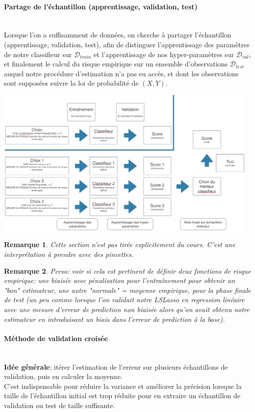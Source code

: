 \documentclass[a4paper]{article}
\theoremstyle{plain}
\newtheorem*{remark*}{Remarque}
\newcommand{\myparagraph}[1]{\paragraph{#1}\mbox{}\\}
\begin{document}
\myparagraph{Partage de l'échantillon (apprentissage, validation, test)} 
Lorsque l'on a suffisamment de données, on cherche à partager l'échantillon (apprentissage, validation, test), afin de distinguer l'apprentissage des paramètres de notre classifieur sur $\mathcal{D}_{train}$ et l'apprentissage de nos hyper-paramètres sur $\mathcal{D}_{val}$, et finalement le calcul du risque empirique sur un ensemble d'observations $\mathcal{D}_{test}$ auquel notre procédure d'estimation n'a pas eu accès, et dont les observations sont supposées suivre la loi de probabilité de $(X,Y)$.

\includegraphics[width=13cm]{Validation.png}

\begin{remark*}
Cette section n'est pas tirée explicitement du cours. C'est une interprétation à prendre avec des pincettes. 
\end{remark*}
\begin{remark*}
Perso: voir si cela est pertinent de définir deux fonctions de risque empirique: une biaisée avec pénalisation pour l'entraînement pour obtenir un "bon" estimateur, une autre "normale" = moyenne empirique, pour la phase finale de test (un peu comme lorsque l'on validait notre LSLasso en regression linéaire avec une mesure d'erreur de prediction non biaisée alors qu'on avait obtenu notre estimateur en introduisant un biais dans l'erreur de prediction à la base). 
\end{remark*}
\myparagraph{Méthode de validation croisée}
\textbf{Idée générale}: itérer l'estimation de l'erreur sur plusieurs échantillons de validation, puis en calculer la moyenne.\\

C'est indispensable pour réduire la variance et améliorer la précision lorsque la taille de l'échantillon initial est trop réduite pour en extraire un échantillon de validation ou test de taille suffisante.\\
\end{document}
